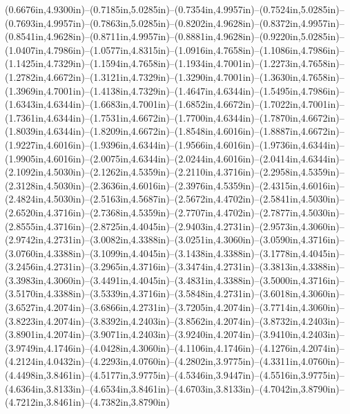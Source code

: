 (0.6676in,4.9300in)--(0.7185in,5.0285in)--(0.7354in,4.9957in)--(0.7524in,5.0285in)--(0.7693in,4.9957in)--(0.7863in,5.0285in)--(0.8202in,4.9628in)--(0.8372in,4.9957in)--(0.8541in,4.9628in)--(0.8711in,4.9957in)--(0.8881in,4.9628in)--(0.9220in,5.0285in)--(1.0407in,4.7986in)--(1.0577in,4.8315in)--(1.0916in,4.7658in)--(1.1086in,4.7986in)--(1.1425in,4.7329in)--(1.1594in,4.7658in)--(1.1934in,4.7001in)--(1.2273in,4.7658in)--(1.2782in,4.6672in)--(1.3121in,4.7329in)--(1.3290in,4.7001in)--(1.3630in,4.7658in)--(1.3969in,4.7001in)--(1.4138in,4.7329in)--(1.4647in,4.6344in)--(1.5495in,4.7986in)--(1.6343in,4.6344in)--(1.6683in,4.7001in)--(1.6852in,4.6672in)--(1.7022in,4.7001in)--(1.7361in,4.6344in)--(1.7531in,4.6672in)--(1.7700in,4.6344in)--(1.7870in,4.6672in)--(1.8039in,4.6344in)--(1.8209in,4.6672in)--(1.8548in,4.6016in)--(1.8887in,4.6672in)--(1.9227in,4.6016in)--(1.9396in,4.6344in)--(1.9566in,4.6016in)--(1.9736in,4.6344in)--(1.9905in,4.6016in)--(2.0075in,4.6344in)--(2.0244in,4.6016in)--(2.0414in,4.6344in)--(2.1092in,4.5030in)--(2.1262in,4.5359in)--(2.2110in,4.3716in)--(2.2958in,4.5359in)--(2.3128in,4.5030in)--(2.3636in,4.6016in)--(2.3976in,4.5359in)--(2.4315in,4.6016in)--(2.4824in,4.5030in)--(2.5163in,4.5687in)--(2.5672in,4.4702in)--(2.5841in,4.5030in)--(2.6520in,4.3716in)--(2.7368in,4.5359in)--(2.7707in,4.4702in)--(2.7877in,4.5030in)--(2.8555in,4.3716in)--(2.8725in,4.4045in)--(2.9403in,4.2731in)--(2.9573in,4.3060in)--(2.9742in,4.2731in)--(3.0082in,4.3388in)--(3.0251in,4.3060in)--(3.0590in,4.3716in)--(3.0760in,4.3388in)--(3.1099in,4.4045in)--(3.1438in,4.3388in)--(3.1778in,4.4045in)--(3.2456in,4.2731in)--(3.2965in,4.3716in)--(3.3474in,4.2731in)--(3.3813in,4.3388in)--(3.3983in,4.3060in)--(3.4491in,4.4045in)--(3.4831in,4.3388in)--(3.5000in,4.3716in)--(3.5170in,4.3388in)--(3.5339in,4.3716in)--(3.5848in,4.2731in)--(3.6018in,4.3060in)--(3.6527in,4.2074in)--(3.6866in,4.2731in)--(3.7205in,4.2074in)--(3.7714in,4.3060in)--(3.8223in,4.2074in)--(3.8392in,4.2403in)--(3.8562in,4.2074in)--(3.8732in,4.2403in)--(3.8901in,4.2074in)--(3.9071in,4.2403in)--(3.9240in,4.2074in)--(3.9410in,4.2403in)--(3.9749in,4.1746in)--(4.0428in,4.3060in)--(4.1106in,4.1746in)--(4.1276in,4.2074in)--(4.2124in,4.0432in)--(4.2293in,4.0760in)--(4.2802in,3.9775in)--(4.3311in,4.0760in)--(4.4498in,3.8461in)--(4.5177in,3.9775in)--(4.5346in,3.9447in)--(4.5516in,3.9775in)--(4.6364in,3.8133in)--(4.6534in,3.8461in)--(4.6703in,3.8133in)--(4.7042in,3.8790in)--(4.7212in,3.8461in)--(4.7382in,3.8790in)
